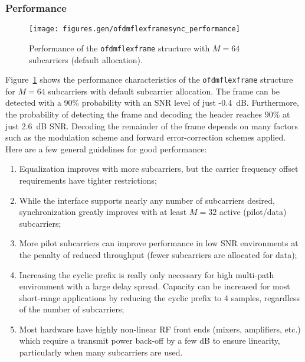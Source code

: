 \subsubsection{Performance}
\label{module:framing:ofdmflexframe:performance}
%

% 
%
\begin{figure}
\centering
  \texttt{[image: figures.gen/ofdmflexframesync\_performance]}
\caption{Performance of the {\tt ofdmflexframe} structure with
         $M=64$ subcarriers (default allocation).}
\label{fig:module:framing:ofdmflexframe_performance}
\end{figure}
%
Figure~\ref{fig:module:framing:ofdmflexframe_performance} shows the
performance characteristics of the {\tt ofdmflexframe} structure for
$M=64$ subcarriers with default subcarrier allocation.
The frame can be detected with a 90\% probability with an SNR level of
just -0.4~dB.
Furthermore, the probability of detecting the frame and decoding the
header reaches 90\% at just 2.6~dB SNR.
Decoding the remainder of the frame depends on many factors such as the
modulation scheme and forward error-correction schemes applied.
%
Here are a few general guidelines for good performance:
\begin{enumerate}
\item Equalization improves with more subcarriers, but the carrier
      frequency offset requirements have tighter restrictions;
\item While the interface supports nearly any number of subcarriers
      desired, synchronization greatly improves with at least $M=32$
      active (pilot/data) subcarriers;
\item More pilot subcarriers can improve performance in low SNR 
      environments at the penalty of reduced throughput
      (fewer subcarriers are allocated for data);
\item Increasing the cyclic prefix is really only necessary for high
      multi-path environment with a large delay spread.
      Capacity can be increased for most short-range applications by
      reducing the cyclic prefix to 4 samples, regardless of the number
      of subcarriers;
\item Most hardware have highly non-linear RF front ends (mixers,
      amplifiers, etc.) which require a transmit power back-off by a few
      dB to ensure linearity, particularly when many subcarriers are
      used.
\end{enumerate}
%
